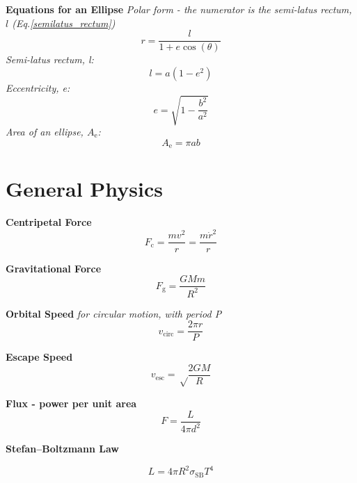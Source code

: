 \documentclass{article}
\begin{document}
\textbf {Equations for an Ellipse}
\vspace{5mm}
\textit {Polar form - the numerator is the semi-latus rectum, \(l\) (Eq.\ref{semilatus_rectum})}
\begin{equation}
r = \frac {l} {1 + e \cos\left(\theta\right)}
\end{equation}
\textit {Semi-latus rectum, l:}
\begin{equation} \label{semilatus_rectum}
l = a \left(1-e^2\right) 
\end{equation}
\textit {Eccentricity, e:}
\begin{equation}
e = \sqrt {1 - \frac {b^2} {a^2}} 
\end{equation}
\textit {Area of an ellipse, \(A_\mathrm{e}\):}
\begin{equation}
A_\mathrm{e} = \pi a b 
\end{equation}


\newpage

\section {General Physics}

\textbf {Centripetal Force} 
\begin{equation}\label{centripetal_force}
F_\mathrm{c} = \frac {m v^2}{r} = \frac {m \dot{r}^2}{r} 
\end{equation}

\textbf {Gravitational Force} 
\begin{equation} \label{gravitational_force}
F_\mathrm{g} = \frac {G M m} {R^2} 
\end{equation}

\textbf {Orbital Speed}
\textit{for circular motion, with period P}
\begin{equation} \label{orbital_speed}
v_\mathrm{circ} = \frac {2 \pi r}{P}
\end{equation}
 
\textbf {Escape Speed}
\begin{equation}
v_\mathrm{esc} = \sqrt \frac {2 G M} {R}
\end{equation}

\textbf {Flux - power per unit area}
\begin{equation}
F = \frac {L} {4 \pi d^2}
\end{equation}

\textbf {Stefan–Boltzmann Law}

\begin{equation}
L = 4 \pi R^2 \sigma_\mathrm{SB} T^4
\end{equation}
\end{document}
